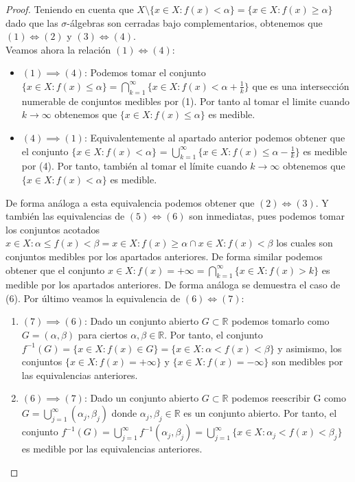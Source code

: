 \begin{proof}
    Teniendo en cuenta que $X \setminus \{x \in X : f(x) < \alpha\} = \{x \in X : f(x) \geq \alpha\}$ dado que las $\sigma$-álgebras son cerradas bajo complementarios, obtenemos que $(1) \iff (2) $ y $(3) \iff (4)$.\\
    Veamos ahora la relación $(1) \iff (4)$:
    \vspace{-0.5em}
    \begin{itemize}
        \item $(1) \implies (4)$: Podemos tomar el conjunto $\{x \in X : f(x) \leq \alpha\} = \bigcap_{k = 1}^{\infty}{\{x \in X : f(x) < \alpha + \frac{1}{k}\}}$ que es una intersección numerable de conjuntos medibles por (1). Por tanto al tomar el limite cuando $k \to \infty$ obtenemos que $\{x \in X : f(x) \leq \alpha\}$ es medible.
        \item $(4) \implies (1)$: Equivalentemente al apartado anterior podemos obtener que el conjunto $\{x \in X : f(x) < \alpha\}$ = $\bigcup_{k = 1}^{\infty}{\{x \in X : f(x) \leq \alpha - \frac{1}{k}\}}$ es medible por (4). Por tanto, también al tomar el límite cuando $k \to \infty$ obtenemos que $\{x \in X : f(x) < \alpha\}$ es medible.
    \end{itemize}
    De forma análoga a esta equivalencia podemos obtener que $(2) \iff (3)$. Y también las equivalencias de $(5) \iff (6)$ son inmediatas, pues podemos tomar los conjuntos acotados ${x \in X : \alpha \leq f(x) < \beta} = {x \in X : f(x) \geq \alpha} \cap {x \in X : f(x) < \beta}$ los cuales son conjuntos medibles por los apartados anteriores. De forma similar podemos obtener que el conjunto ${x \in X : f(x) = +\infty} = \bigcap_{k = 1}^{\infty}{\{x \in X : f(x) > k\}}$ es medible por los apartados anteriores. De forma análoga se demuestra el caso de (6).
    Por último veamos la equivalencia de $(6) \iff (7)$:
    \begin{enumerate}
        \item $(7) \implies (6)$: Dado un conjunto abierto $G \subset \mathbb{R}$ podemos tomarlo como $G = (\alpha, \beta)$ para ciertos $\alpha, \beta \in \mathbb{R}$. Por tanto, el conjunto $f^{-1}(G) = \{x \in X : f(x) \in G\} = \{x \in X : \alpha < f(x) < \beta\}$  y asimismo, los conjuntos $\{x \in X : f(x) = +\infty\}$ y $\{x \in X : f(x) = -\infty\}$ son medibles por las equivalencias anteriores.
        \item $(6) \implies (7)$: Dado un conjunto abierto $G \subset \mathbb{R}$ podemos reescribir G como $G = \bigcup_{j = 1}^{\infty}(\alpha_j, \beta_j)$ donde $\alpha_j, \beta_j \in \mathbb{R}$ es un conjunto abierto. Por tanto, el conjunto $f^{-1}(G) = \bigcup_{j = 1}^{\infty}{f^{-1}(\alpha_j, \beta_j)} = \bigcup_{j = 1}^{\infty}{\{x \in X : \alpha_j < f(x) < \beta_j\}}$ es medible por las equivalencias anteriores.
    \end{enumerate}
\end{proof}

